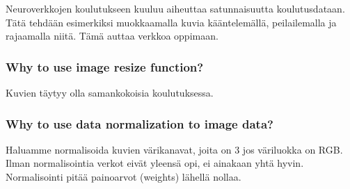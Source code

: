 \documentclass[11pt]{article}
\begin{document}
Neuroverkkojen koulutukseen kuuluu aiheuttaa satunnaisuutta
koulutusdataan. Tätä tehdään esimerkiksi muokkaamalla kuvia
kääntelemällä, peilailemalla ja rajaamalla niitä. Tämä auttaa verkkoa
oppimaan.

\hypertarget{why-to-use-image-resize-function}{%
\subsubsection{Why to use image resize
function?}\label{why-to-use-image-resize-function}}

Kuvien täytyy olla samankokoisia koulutuksessa.

\hypertarget{why-to-use-data-normalization-to-image-data}{%
\subsubsection{Why to use data normalization to image
data?}\label{why-to-use-data-normalization-to-image-data}}

Haluamme normalisoida kuvien värikanavat, joita on 3 jos väriluokka on
RGB. Ilman normalisointia verkot eivät yleensä opi, ei ainakaan yhtä
hyvin. Normalisointi pitää painoarvot (weights) lähellä nollaa.


    
    
    
    
\end{document}
